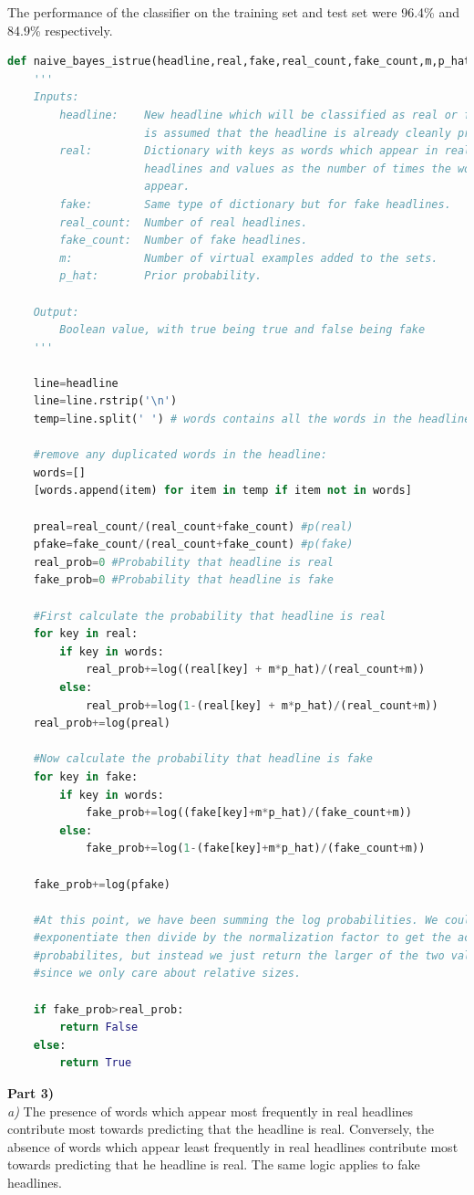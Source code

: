\documentclass{article}
\begin{document}
The performance of the classifier on the training set and test set were 96.4\% and 84.9\% respectively.\\
\begin{lstlisting}[language=Python, caption=Naive Bayes Classifier]
def naive_bayes_istrue(headline,real,fake,real_count,fake_count,m,p_hat):
    '''
    Inputs:
        headline:    New headline which will be classified as real or fake. It 
                     is assumed that the headline is already cleanly processed.
        real:        Dictionary with keys as words which appear in real  
                     headlines and values as the number of times the words 
                     appear.
        fake:        Same type of dictionary but for fake headlines.
        real_count:  Number of real headlines.
        fake_count:  Number of fake headlines.
        m:           Number of virtual examples added to the sets.
        p_hat:       Prior probability. 
        
    Output:
        Boolean value, with true being true and false being fake
    '''
    
    line=headline
    line=line.rstrip('\n')
    temp=line.split(' ') # words contains all the words in the headline
    
    #remove any duplicated words in the headline:
    words=[]
    [words.append(item) for item in temp if item not in words]

    preal=real_count/(real_count+fake_count) #p(real)
    pfake=fake_count/(real_count+fake_count) #p(fake)
    real_prob=0 #Probability that headline is real
    fake_prob=0 #Probability that headline is fake
    
    #First calculate the probability that headline is real
    for key in real:
        if key in words:
            real_prob+=log((real[key] + m*p_hat)/(real_count+m))
        else:
            real_prob+=log(1-(real[key] + m*p_hat)/(real_count+m))
    real_prob+=log(preal)
    
    #Now calculate the probability that headline is fake
    for key in fake:
        if key in words:
            fake_prob+=log((fake[key]+m*p_hat)/(fake_count+m))
        else:
            fake_prob+=log(1-(fake[key]+m*p_hat)/(fake_count+m))
    
    fake_prob+=log(pfake)

    #At this point, we have been summing the log probabilities. We could 
    #exponentiate then divide by the normalization factor to get the actual
    #probabilites, but instead we just return the larger of the two values 
    #since we only care about relative sizes.
    
    if fake_prob>real_prob:
        return False
    else:
        return True
\end{lstlisting}
\newpage
\textbf{Part 3)}\\
\textit{a)} The presence of words which appear most frequently in real headlines contribute most towards predicting that the headline is real. Conversely, the absence of words which appear least frequently in real headlines contribute most towards predicting that he headline is real. The same logic applies to fake headlines.\\
\end{document}

